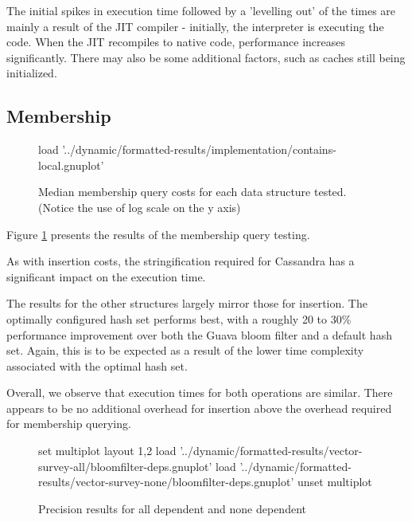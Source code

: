 	The initial spikes in execution time followed by a 'levelling out' of the times are mainly a result of the JIT compiler - initially, the interpreter is executing the code. When the JIT recompiles to native code, performance increases significantly. There may also be some additional factors, such as caches still being initialized.
	
	\subsection{Membership} \label{sec:results/bfimpl/member}
	
	\begin{figure}
		\centering
		\begin{gnuplot}[terminal=pdf]
			load '../dynamic/formatted-results/implementation/contains-local.gnuplot'
		\end{gnuplot}
		\caption{Median membership query costs for each data structure tested. (Notice the use of log scale on the y axis)}
		\label{chart:impl-member}
	\end{figure}
	
	Figure \ref{chart:impl-member} presents the results of the membership query testing.
	
	As with insertion costs, the stringification required for Cassandra has a significant impact on the execution time.
	
	The results for the other structures largely mirror those for insertion. The optimally configured hash set performs best, with a roughly 20 to 30\% performance improvement over both the Guava bloom filter and a default hash set. Again, this is to be expected as a result of the lower time complexity associated with the optimal hash set.
	
	Overall, we observe that execution times for both operations are similar. There appears to be no additional overhead for insertion above the overhead required for membership querying.
	
	\begin{figure}
		\centering
		\begin{gnuplot}[terminal=pdf]
		set multiplot layout 1,2
			load '../dynamic/formatted-results/vector-survey-all/bloomfilter-deps.gnuplot'
			load '../dynamic/formatted-results/vector-survey-none/bloomfilter-deps.gnuplot'
		unset multiplot
		\end{gnuplot}
		\caption{Precision results for all dependent and none dependent}
		\label{chart:precision-all}
	\end{figure}
	
